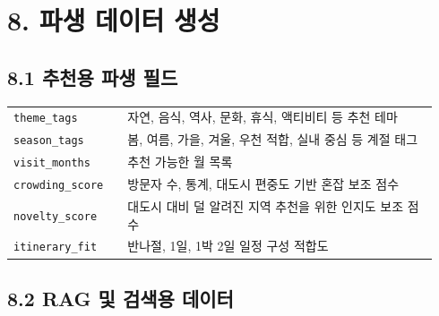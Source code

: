 \documentclass[12pt,a4paper]{article}
\newcommand{\DocNeedspace}[1]{\par\ifdim\dimexpr\pagegoal-\pagetotal\relax<#1\newpage\fi}
\begin{document}
\newpage

\DocNeedspace{10\baselineskip}
\section*{8. 파생 데이터 생성}


\DocNeedspace{8\baselineskip}
\subsection*{8.1 추천용 파생 필드}


\DocNeedspace{18\baselineskip}
\begin{small}
\begin{longtable}{@{}>{\RaggedRight\arraybackslash}m{0.259\linewidth}>{\RaggedRight\arraybackslash}m{0.681\linewidth}@{}}
\toprule
\multicolumn{1}{>{\centering\arraybackslash}m{0.259\linewidth}}{\textbf{파생 필드}} & \multicolumn{1}{>{\centering\arraybackslash}m{0.681\linewidth}}{\textbf{설명}} \\
\midrule
\endhead
\texttt{theme\_\allowbreak{}tags} & 자연, 음식, 역사, 문화, 휴식, 액티비티 등 추천 테마 \\
\texttt{season\_\allowbreak{}tags} & 봄, 여름, 가을, 겨울, 우천 적합, 실내 중심 등 계절 태그 \\
\texttt{visit\_\allowbreak{}months} & 추천 가능한 월 목록 \\
\texttt{crowding\_\allowbreak{}score} & 방문자 수, 통계, 대도시 편중도 기반 혼잡 보조 점수 \\
\texttt{novelty\_\allowbreak{}score} & 대도시 대비 덜 알려진 지역 추천을 위한 인지도 보조 점수 \\
\texttt{itinerary\_\allowbreak{}fit} & 반나절, 1일, 1박 2일 일정 구성 적합도 \\
\bottomrule
\end{longtable}
\end{small}


\DocNeedspace{24\baselineskip}
\subsection*{8.2 RAG 및 검색용 데이터}
\end{document}
